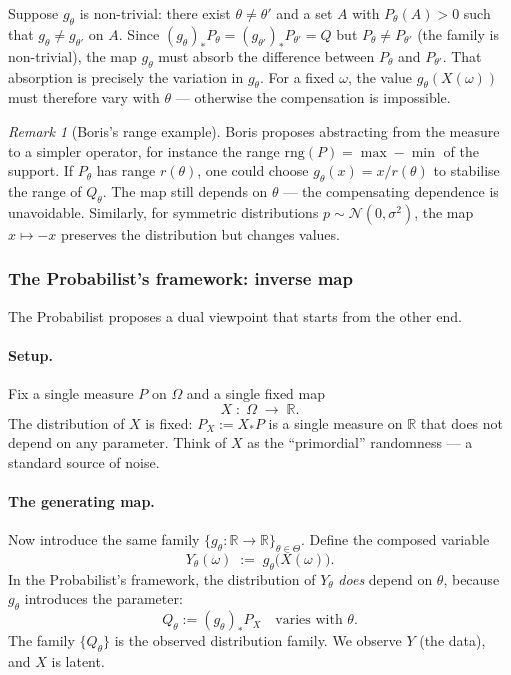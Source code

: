 \documentclass[a4paper,oneside,12pt]{extarticle}
\theoremstyle{plain}
\theoremstyle{definition}
\theoremstyle{remark}
\newtheorem{remark}[proposition]{Remark}
\begin{document}
Suppose $g_\theta$ is non-trivial: there exist $\theta \neq
\theta'$ and a set $A$ with $P_\theta(A) > 0$ such that
$g_\theta \neq g_{\theta'}$ on $A$.  Since
$(g_\theta)_* P_\theta = (g_{\theta'})_* P_{\theta'} = Q$
but $P_\theta \neq P_{\theta'}$ (the family is non-trivial), the
map $g_\theta$ must absorb the difference between $P_\theta$ and
$P_{\theta'}$.  That absorption is precisely the variation in
$g_\theta$.  For a fixed $\omega$, the value $g_\theta(X(\omega))$
must therefore vary with $\theta$ — otherwise the compensation is
impossible.

\begin{remark}[Boris's range example]
Boris proposes abstracting from the measure to a simpler operator,
for instance the range $\mathrm{rng}(P) = \max - \min$ of the
support.  If $P_\theta$ has range $r(\theta)$, one could choose
$g_\theta(x) = x/r(\theta)$ to stabilise the range of $Q_\theta$.
The map still depends on $\theta$ — the compensating dependence is
unavoidable.  Similarly, for symmetric distributions $p \sim
\mathcal{N}(0,\sigma^2)$, the map $x \mapsto -x$ preserves the
distribution but changes values.
\end{remark}


\subsubsection*{The Probabilist's framework: inverse map}

The Probabilist proposes a dual viewpoint that starts from the other end.

\paragraph{Setup.}
Fix a single measure $P$ on $\Omega$ and a single fixed map
\[
  X \;:\; \Omega \;\longrightarrow\; \mathbb{R}.
\]
The distribution of $X$ is fixed: $P_X := X_* P$ is a single
measure on $\mathbb{R}$ that does not depend on any parameter.
Think of $X$ as the ``primordial'' randomness — a standard source
of noise.

\paragraph{The generating map.}
Now introduce the same family $\{g_\theta : \mathbb{R} \to
\mathbb{R}\}_{\theta \in \Theta}$.  Define the composed variable
\[
  Y_\theta(\omega) \;:=\; g_\theta\!\bigl(X(\omega)\bigr).
\]
In the Probabilist's framework, the distribution of $Y_\theta$ \emph{does}
depend on $\theta$, because $g_\theta$ introduces the parameter:
\[
  Q_\theta := (g_\theta)_* P_X \quad \text{varies with } \theta.
\]
The family $\{Q_\theta\}$ is the observed distribution family.
We observe $Y$ (the data), and $X$ is latent.
\end{document}
